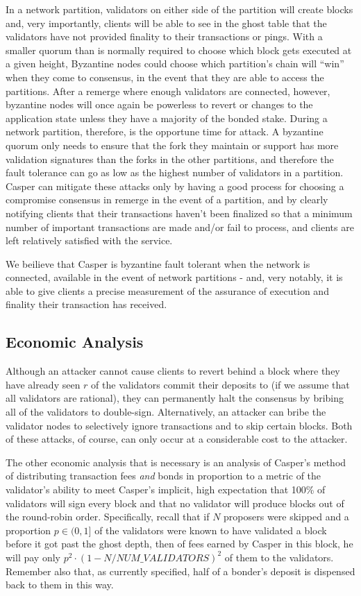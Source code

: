 \documentclass[11pt,a4paper]{article}
\begin{document}
In a network partition, validators on either side of the partition will create blocks and, very importantly, clients will be able to see in the ghost table that the validators have not provided finality to their transactions or pings. With a smaller quorum than is normally required to choose which block gets executed at a given height, Byzantine nodes could choose which partition's chain will ``win'' when they come to consensus, in the event that they are able to access the partitions. After a remerge where enough validators are connected, however, byzantine nodes will once again be powerless to revert or changes to the application state unless they have a majority of the bonded stake. During a network partition, therefore, is the opportune time for attack. A byzantine quorum only needs to ensure that the fork they maintain or support has more validation signatures than the forks in the other partitions, and therefore the fault tolerance can go as low as the highest number of validators in a partition. Casper can mitigate these attacks only by having a good process for choosing a compromise consensus in remerge in the event of a partition, and by clearly notifying clients that their transactions haven't been finalized so that a minimum number of important transactions are made and/or fail to process, and clients are left relatively satisfied with the service.

We beilieve that Casper is byzantine fault tolerant when the network is connected, available in the event of network partitions - and, very notably, it is able to give clients a precise measurement of the assurance of execution and finality their transaction has received.


\subsection{Economic Analysis}

Although an attacker cannot cause clients to revert behind a block where they have already seen $r$ of the validators commit their deposits to (if we assume that all validators are rational), they can permanently halt the consensus by bribing all of the validators to double-sign. Alternatively, an attacker can bribe the validator nodes to selectively ignore transactions and to skip certain blocks. Both of these attacks, of course, can only occur at a considerable cost to the attacker.

The other economic analysis that is necessary is an analysis of Casper's method of distributing transaction fees \emph{and} bonds in proportion to a metric of the validator's ability to meet Casper's implicit, high expectation that 100\% of validators will sign every block and that no validator will produce blocks out of the round-robin order. Specifically, recall that if $N$ proposers were skipped and a proportion $p \in (0,1]$ of the validators were known to have validated a block before it got past the ghost depth, then of fees earned by Casper in this block, he will pay only $p^2 \cdot (1 - N/NUM\_VALIDATORS)^2$ of them to the validators. Remember also that, as currently specified, half of a bonder's deposit is dispensed back to them in this way.
\end{document}
